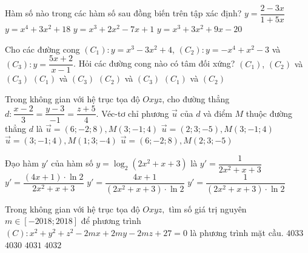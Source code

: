 	\begin{ex}%
		Hàm số nào trong các hàm số sau đồng biến trên tập xác định?
		\choice
		{$y=\dfrac{2-3x}{1+5x}$}
		{$y=x^4+3x^2+18$}
		{$y=x^3+2x^2-7x+1$}
		{\True $y=x^3+3x^2+9x-20$}
	\end{ex}
	
	\begin{ex}%
		Cho các đường cong $(C_1)\colon y=x^3-3x^2+4$, $(C_2)\colon y=-x^4+x^2-3$ và $(C_3)\colon y=\dfrac{5x+2}{x-1}$. Hỏi các đường cong nào có tâm đối xứng?
		\choice
		{$(C_1)$, $(C_2)$ và $(C_3)$}
		{\True $(C_1)$ và $(C_3)$}
		{$(C_2)$ và $(C_3)$}
		{$(C_1)$ và $(C_2)$}
	\end{ex}
	
	\begin{ex}%
		Trong không gian với hệ trục tọa độ $Oxyz$, cho đường thẳng $d\colon \dfrac{x-2}{3}=\dfrac{y-3}{-1}=\dfrac{z+5}{4}$. Véc-tơ chỉ phương $\overrightarrow{u}$ của $d$ và điểm $M$ thuộc đường thẳng $d$ là
		\choice
		{$\overrightarrow{u}=(6;-2;8),M(3;-1;4)$}
		{$\overrightarrow{u}=(2;3;-5),M(3;-1;4)$}
		{$\overrightarrow{u}=(3;-1;4),M(1;3;-4)$}
		{\True $\overrightarrow{u}=(6;-2;8),M(2;3;-5)$ }
	\end{ex}
	
	\begin{ex}%
		Đạo hàm $y'$ của hàm số $y=\log_2(2x^2+x+3)$ là
		\choice
		{$y'=\dfrac{1}{2x^2+x+3}$}
		{$y'=\dfrac{(4x+1)\cdot \ln 2}{2x^2+x+3}$}
		{ \True $y'=\dfrac{4x+1}{(2x^2+x+3)\cdot \ln 2}$}
		{$y'=\dfrac{1}{(2x^2+x+3)\cdot \ln 2}$}
	\end{ex}
	
	\begin{ex}%
		Trong không gian với hệ trục tọa độ $Oxyz,$ tìm số giá trị nguyên $m\in [-2018;2018]$ để
		phương trình $(C)\colon x^2+y^2+z^2-2mx+2my-2mz+27=0$ là phương trình mặt cầu.
		\choice
		{$4033$}
		{\True $4030$}
		{$4031$}
		{$4032$}
	\end{ex}
	
